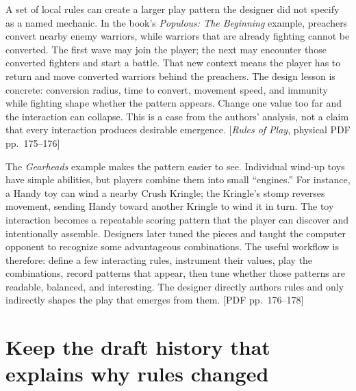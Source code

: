 \hypertarget{06-engine-ii-ch047-design-for-interaction-patterns-then-tune-what-players-discover}{}

A set of local rules can create a larger play pattern the designer did not specify as a named mechanic. In the book's \emph{Populous: The Beginning} example, preachers convert nearby enemy warriors, while warriors that are already fighting cannot be converted. The first wave may join the player; the next may encounter those converted fighters and start a battle. That new context means the player has to return and move converted warriors behind the preachers. The design lesson is concrete: conversion radius, time to convert, movement speed, and immunity while fighting shape whether the pattern appears. Change one value too far and the interaction can collapse. This is a case from the authors' analysis, not a claim that every interaction produces desirable emergence. {[}\emph{Rules of Play}, physical PDF pp.~175--176{]}

The \emph{Gearheads} example makes the pattern easier to see. Individual wind-up toys have simple abilities, but players combine them into small ``engines.'' For instance, a Handy toy can wind a nearby Crush Kringle; the Kringle's stomp reverses movement, sending Handy toward another Kringle to wind it in turn. The toy interaction becomes a repeatable scoring pattern that the player can discover and intentionally assemble. Designers later tuned the pieces and taught the computer opponent to recognize some advantageous combinations. The useful workflow is therefore: define a few interacting rules, instrument their values, play the combinations, record patterns that appear, then tune whether those patterns are readable, balanced, and interesting. The designer directly authors rules and only indirectly shapes the play that emerges from them. {[}PDF pp.~176--178{]}

\section{Keep the draft history that explains why rules changed}\label{06-engine-ii-ch047-keep-the-draft-history-that-explains-why-rules-changed}

\hypertarget{06-engine-ii-ch047-keep-the-draft-history-that-explains-why-rules-changed}{}

